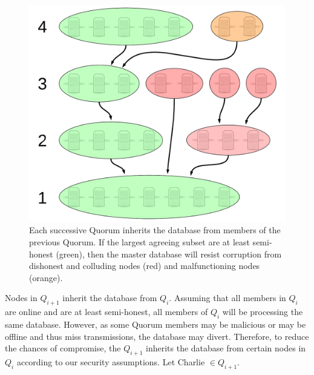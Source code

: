 \documentclass[USenglish,oneside,twocolumn]{article}
\begin{document}
\begin{figure}[h]
	\centering
	\includegraphics[width=0.7\linewidth]{../assets/images/LucidCharts/Page-chain2.pdf}
	\caption{Each successive Quorum inherits the database from members of the previous Quorum. If the largest agreeing subset are at least semi-honest (green), then the master database will resist corruption from dishonest and colluding nodes (red) and malfunctioning nodes (orange).}
	\label{fig:databaseInheritance}
\end{figure}

Nodes in $ Q_{i + 1} $ inherit the database from $ Q_{i} $. Assuming that all members in $ Q_{i} $ are online and are at least semi-honest, all members of $ Q_{i} $ will be processing the same database. However, as some Quorum members may be malicious or may be offline and thus miss transmissions, the database may divert. Therefore, to reduce the chances of compromise, the $ Q_{i + 1} $ inherits the database from certain nodes in $ Q_{i} $ according to our security assumptions. Let Charlie $ \in Q_{i + 1} $.
\end{document}
